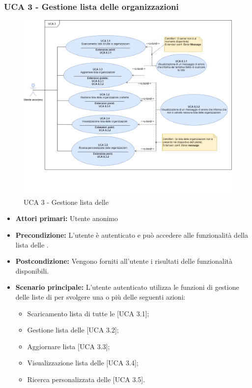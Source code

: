 \subsubsection{UCA 3 - Gestione lista delle organizzazioni}%
\begin{figure}[h]
	\centering
	\includegraphics[scale=0.5, center]{Sezioni/UseCase/Immagini/UCA3.png}
	\caption{UCA 3 - Gestione lista delle }
\end{figure} 

\begin{itemize}
\item \textbf{Attori primari:} Utente anonimo
\item \textbf{Precondizione:} L'utente è autenticato e può accedere alle funzionalità della lista delle .
\item \textbf{Postcondizione:} Vengono forniti all'utente i risultati delle funzionalità disponibili.
\item \textbf{Scenario principale:} L'utente autenticato utilizza le funzioni di gestione delle liste di  per svolgere una o più delle seguenti azioni:
	\begin{itemize}
		\item Scaricamento lista di tutte le  [UCA 3.1];
		\item Gestione lista delle  [UCA 3.2];
		\item Aggiornare lista  [UCA 3.3];
		\item Visualizzazione lista delle  [UCA 3.4];
		\item Ricerca personalizzata delle  [UCA 3.5].
	\end{itemize}
\end{itemize}

